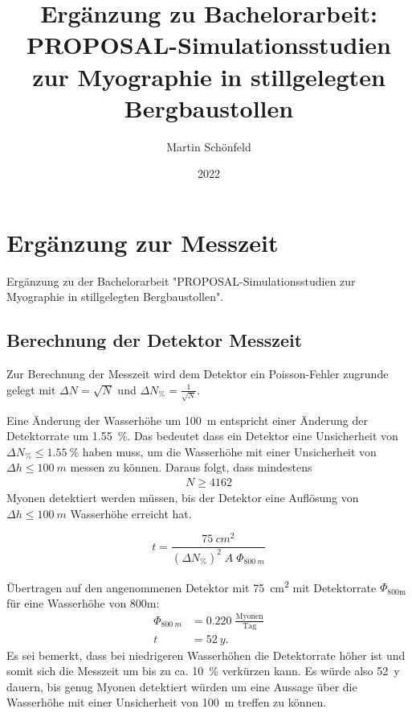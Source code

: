 \documentclass[
  tucolor,       %
  BCOR=12mm,     %
  parskip=half,  %
  open=any,      %
  cleardoublepage=plain,  %
]{tudothesis}
\author{Martin Schönfeld}
\title{Ergänzung zu Bachelorarbeit: PROPOSAL-Simulationsstudien zur Myographie in stillgelegten Bergbaustollen}
\date{2022}
\begin{document}
% 
 

% 

\mainmatter

\chapter{Ergänzung zur Messzeit}
Ergänzung zu der Bachelorarbeit 
"PROPOSAL-Simulationsstudien zur Myographie in stillgelegten Bergbaustollen".
\section{Berechnung der Detektor Messzeit}

Zur Berechnung der Messzeit wird dem Detektor ein Poisson-Fehler zugrunde gelegt
mit $\Delta N = \sqrt{N}$ und $\Delta N_\%  = \frac{1}{\sqrt{N}}$.

Eine Änderung der Wasserhöhe um \SI[]{100}[]{m} entspricht einer Änderung
der Detektorrate um \SI[]{1,55}[]{\%}.
Das bedeutet dass ein Detektor eine Unsicherheit von  $\Delta N_\% \leq \SI[]{1,55}[]{\%}$
haben muss, um die Wasserhöhe mit einer Unsicherheit von 
$\Delta h \leq \SI[]{100}[]{m}$ messen zu können.
Daraus folgt, dass mindestens 
\begin{align}
  N \geq  4162
\end{align}
 Myonen detektiert werden müssen, bis der Detektor 
eine Auflösung von $\Delta h \leq \SI[]{100}[]{m}$ Wasserhöhe erreicht hat.

\begin{equation}
  t = \frac{\SI[]{75}[]{cm^2}}{(\Delta N_\%)^2 \;A \; \Phi_{\SI[]{800}[]{m}}}
\end{equation}

Übertragen auf den angenommenen Detektor mit \SI[]{75}[]{cm^2} mit 
Detektorrate $\Phi_\mathrm{800m}$ für eine Wasserhöhe von 800m:
\begin{align}
  \Phi_{\SI[]{800}[]{m}} &= \num{0,220} \; \frac{\mathrm{Myonen}}{\mathrm{Tag}} \\
  t &= \SI[]{52}[]{y}.
\end{align}
Es sei bemerkt, dass bei niedrigeren Wasserhöhen die Detektorrate höher ist und somit sich die Messzeit
um bis zu ca. \SI[]{10}[]{\%} verkürzen kann.
Es würde also \SI[]{52}[]{y} dauern, bis genug Myonen detektiert würden
um eine Aussage über die Wasserhöhe mit einer Unsicherheit von \SI[]{100}[]{m} 
treffen zu können. 
\end{document}
